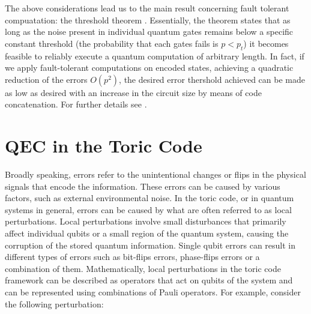 \documentclass{Configuration_Files/PoliMi3i_thesis}
\begin{document}
The above considerations lead us to the main result concerning fault tolerant compuatation: the threshold theorem \cite{Nie06}. Essentially, the theorem states that as long as the noise present in individual quantum gates remains below a specific constant threshold (the probability that each gates fails is $p<p_t$) it becomes feasible to reliably execute a quantum computation of arbitrary length. In fact, if we apply fault-tolerant computations on encoded states, achieving a quadratic reduction of the errors $O(p^2)$, the desired error thershold achieved can be made as low as desired with an increase in the circuit size by means of code concatenation. For further details see \cite{Nie06}.\newline














\newpage
\section{QEC in the Toric Code}
\label{sec:TC}

Broadly speaking, errors refer to the unintentional changes or flips in the physical signals that encode the information. These errors can be caused by various factors, such as external environmental noise. In the toric code, or in quantum systems in general, errors can be caused by what are often referred to as local perturbations. Local perturbations involve small disturbances that primarily affect individual qubits or a small region of the quantum system, causing the corruption of the stored quantum information. Single qubit errors can result in different types of errors such as bit-flips errors, phase-flips errors or a combination of them. Mathematically, local perturbations in the toric code framework can be described as operators that act on qubits of the system and can be represented using combinations of Pauli operators. For example, consider the following perturbation:
\end{document}
